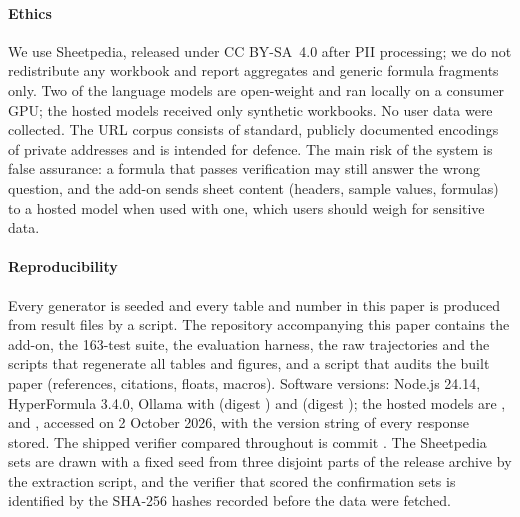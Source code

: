 \paragraph{Ethics}
We use Sheetpedia, released under CC BY-SA~4.0 after PII processing; we do not redistribute any workbook and report aggregates and generic formula fragments only. Two of the language models are open-weight and ran locally on a consumer GPU; the hosted models received only synthetic workbooks. No user data were collected. The URL corpus consists of standard, publicly documented encodings of private addresses and is intended for defence. The main risk of the system is false assurance: a formula that passes verification may still answer the wrong question, and the add-on sends sheet content (headers, sample values, formulas) to a hosted model when used with one, which users should weigh for sensitive data.

\paragraph{Reproducibility}
Every generator is seeded and every table and number in this paper is produced from result files by a script. The repository accompanying this paper contains the add-on, the 163-test suite, the evaluation harness, the raw trajectories and the scripts that regenerate all tables and figures, and a script that audits the built paper (references, citations, floats, macros). Software versions: Node.js 24.14, HyperFormula 3.4.0, Ollama with  (digest ) and  (digest ); the hosted models are ,  and , accessed on 2 October 2026, with the version string of every response stored. The shipped verifier compared throughout is commit . The Sheetpedia sets are drawn with a fixed seed from three disjoint parts of the release archive by the extraction script, and the verifier that scored the confirmation sets is identified by the SHA-256 hashes recorded before the data were fetched.
